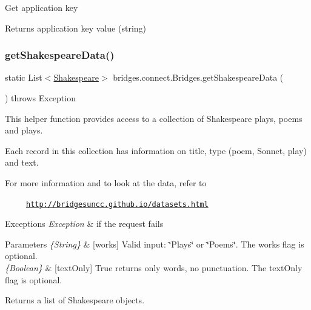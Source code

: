 Get application key

\begin{DoxyReturn}{Returns}
application key value (string) 
\end{DoxyReturn}
\mbox{\label{classbridges_1_1connect_1_1_bridges_adc8d19f28677afb03db53736455de2d0}} 
\subsubsection{\texorpdfstring{get\+Shakespeare\+Data()}{getShakespeareData()}\hspace{0.1cm}{\footnotesize\ttfamily [1/3]}}
{\footnotesize\ttfamily static List$<$\mbox{\hyperlink{classbridges_1_1data__src__dependent_1_1_shakespeare}{Shakespeare}}$>$ bridges.\+connect.\+Bridges.\+get\+Shakespeare\+Data (\begin{DoxyParamCaption}{ }\end{DoxyParamCaption}) throws Exception\hspace{0.3cm}{\ttfamily [static]}}

This helper function provides access to a collection of Shakespeare plays, poems and plays.

Each record in this collection has information on title, type (poem, Sonnet, play) and text. ~\newline


For more information and to look at the data, refer to 

~~~~~\href{http://bridgesuncc.github.io/datasets.html}{\tt http\+://bridgesuncc.\+github.\+io/datasets.\+html} 


\begin{DoxyExceptions}{Exceptions}
{\em Exception} & if the request fails\\
\hline
\end{DoxyExceptions}

\begin{DoxyParams}{Parameters}
{\em \{\+String\}} & \mbox{[}works\mbox{]} Valid input\+: \char`\"{}\+Plays\char`\"{} or \char`\"{}\+Poems\char`\"{}. The works flag is optional.\\
\hline
{\em \{\+Boolean\}} & \mbox{[}text\+Only\mbox{]} True returns only words, no punctuation. The text\+Only flag is optional.\\
\hline
\end{DoxyParams}
\begin{DoxyReturn}{Returns}
a list of Shakespeare objects. 
\end{DoxyReturn}
\mbox{\label{classbridges_1_1connect_1_1_bridges_a53ac587893826c57644f2e03b33ae455}} 
